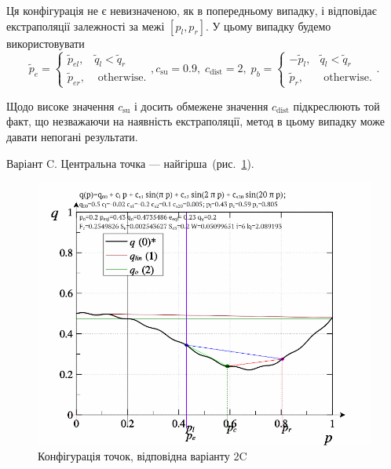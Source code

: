 Ця конфігурація не є невизначеною, як в попередньому випадку,
і відповідає екстраполяції залежності за межі
$[p_l, p_r]$. У цьому випадку будемо використовувати
%
\begin{equation}
  \tilde{p}_e
  =
  \begin{cases}
    \tilde{p}_{el}, & \tilde{q}_l < \tilde{q}_r
    \\
    \tilde{p}_{er}, & \text{ otherwise}.
  \end{cases}
  ,
  c_\mathrm{su} = 0.9, \;  c_\mathrm{dist} = 2,  \;
  p_b =
  \begin{cases}
    -\tilde{p}_l, & \tilde{q}_l < \tilde{q}_r
    \\
    \tilde{p}_r, & \text{ otherwise}.
  \end{cases}.
  \label{atu:eq:pr_e2B}
\end{equation}

Щодо високе значення
$c_\mathrm{su}$ і досить обмежене значення
$c_\mathrm{dist}$ підкреслюють той факт, що незважаючи на наявність
екстраполяції, метод в цьому випадку може давати непогані
результати.


Варіант C. \label{atu:d:p_eql_2C}%
%
Центральна точка --- найгірша~(рис.~\ref{atu:f:pq_2C}).

\begin{figure}[htb!]
  \begin{center}
    \includegraphics[width=60\TW]{p/pq_sin-p_pq_cbad.png}
  \end{center}
  \caption{Конфігурація точок, відповідна варіанту 2C}
  \label{atu:f:pq_2C}
\end{figure}

